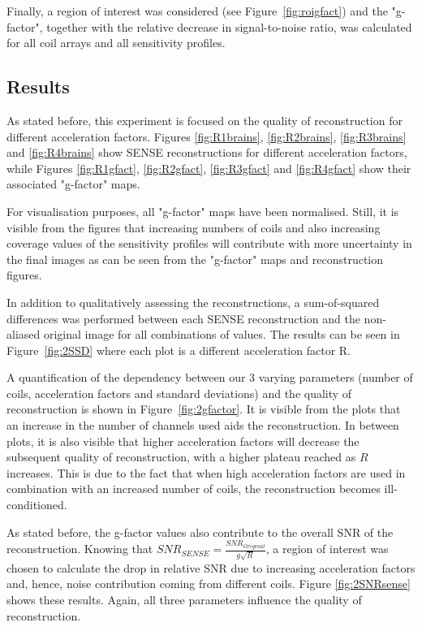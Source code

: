 Finally, a region of interest was considered (see Figure~\ref{fig:roigfact}) and the "g-factor", together with the relative decrease in signal-to-noise ratio, was calculated for all coil arrays and all sensitivity profiles.

\subsection{Results}
As stated before, this experiment is focused on the quality of reconstruction for different acceleration factors. Figures \ref{fig:R1brains}, \ref{fig:R2brains}, \ref{fig:R3brains} and \ref{fig:R4brains} show SENSE reconstructions for different acceleration factors, while Figures \ref{fig:R1gfact}, \ref{fig:R2gfact}, \ref{fig:R3gfact} and \ref{fig:R4gfact} show their associated "g-factor" maps.

For visualisation purposes, all "g-factor" maps have been normalised. Still, it is visible from the figures that increasing numbers of coils and also increasing coverage values of the sensitivity profiles will contribute with more uncertainty in the final images as can be seen from the "g-factor" maps and reconstruction figures. 

In addition to qualitatively assessing the reconstructions, a sum-of-squared differences was performed between each SENSE reconstruction and the non-aliased original image for all combinations of values. The results can be seen in Figure~\ref{fig:2SSD} where each plot is a different acceleration factor R.

A quantification of the dependency between our 3 varying parameters (number of coils, acceleration factors and standard deviations) and the quality of reconstruction is shown in Figure~\ref{fig:2gfactor}. It is visible from the plots that an increase in the number of channels used aids the reconstruction. In between plots, it is also visible that higher acceleration factors will decrease the subsequent quality of reconstruction, with a higher plateau reached as $R$ increases. This is due to the fact that when high acceleration factors are used in combination with an increased number of coils, the reconstruction becomes ill-conditioned.

As stated before, the g-factor values also contribute to the overall SNR of the reconstruction. Knowing that $SNR_{SENSE} = \frac{SNR_{Original}}{g \sqrt{R}}$, a region of interest was chosen to calculate the drop in relative SNR due to increasing acceleration factors and, hence, noise contribution coming from different coils. Figure \ref{fig:2SNRsense} shows these results. Again, all three parameters influence the quality of reconstruction. 

